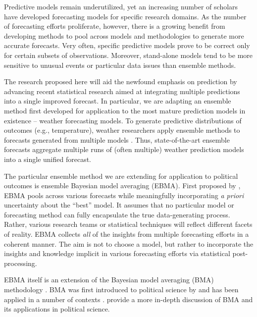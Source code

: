 \documentclass[pdftex,12pt,fullpage,oneside]{amsart}
\begin{document}
Predictive models remain underutilized, yet an increasing number of
scholars have developed forecasting models for specific research
domains.  As the number of forecasting efforts proliferate, however,
there is a growing benefit from developing methods to pool across
models and methodologies to generate more accurate forecasts.  Very
often, specific predictive models prove to be correct only for certain
subsets of observations.  Moreover, stand-alone models tend to be more
sensitive to unusual events or particular data issues than ensemble
methods.

The research proposed here will aid the newfound emphasis on
prediction by advancing recent statistical research aimed at
integrating multiple predictions into a single improved forecast.  In particular,
we are adapting an ensemble method first developed for application to
the most mature prediction models in existence -- weather forecasting
models.  To generate predictive distributions of outcomes (e.g.,
temperature), weather researchers apply ensemble methods to forecasts
generated from multiple models \citep{Raftery:2005}.  Thus,
state-of-the-art ensemble forecasts aggregate multiple runs of (often
multiple) weather prediction models into a single unified forecast.

The particular ensemble method we are extending for application to
political outcomes is ensemble Bayesian model averaging (EBMA). First
proposed by \citet{Raftery:2005}, EBMA pools across various forecasts
while meaningfully incorporating \textit{a priori} uncertainty about
the ``best'' model.  It assumes that no particular model or
forecasting method can fully encapsulate the true data-generating
process.  Rather, various research teams or statistical techniques
will reflect different facets of reality. EBMA collects \textit{all}
of the insights from multiple forecasting efforts in a coherent
manner.  The aim is not to choose a model, but rather to incorporate
the insights and knowledge implicit in various forecasting efforts via
statistical post-processing.

EBMA itself is an extension of the Bayesian model averaging (BMA)
methodology \citep[c.f.,][]{Madigan:1994, Draper:1995, Raftery:1995,
  Hoeting:1999, Clyde:2003, Raftery:2003, Clyde:2004}.  BMA was first
introduced to political science by \citet{Bartels:1997} and has been
applied in a number of contexts \citep[e.g.,][]{Bartels:2001,
  Gill:2004, Imai:2004, Geer:2006b}. \citet{Montgomery:2010c} provide
a more in-depth discussion of BMA and its applications in political
science.
\end{document}
